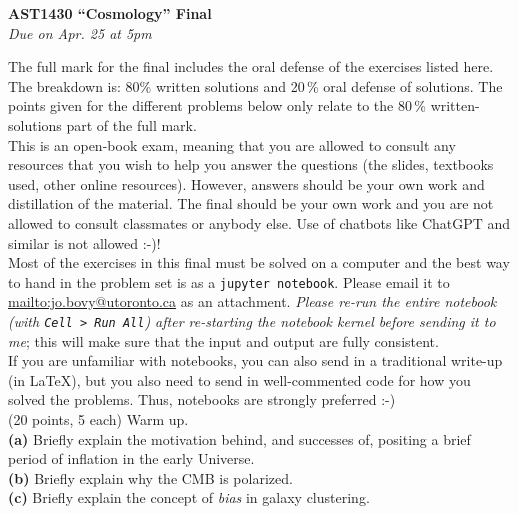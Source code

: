 \documentclass[12pt]{article}
\begin{document}
\begin{center}
{\bf \LARGE AST1430 ``Cosmology'' Final}\\[7pt]
\emph{Due on Apr. 25 at 5pm}\\[7pt]
\end{center}

The full mark for the final includes the oral defense of the exercises
listed here. The breakdown is: 80\% written solutions and 20\,\% oral
defense of solutions. The points given for the different problems
below only relate to the 80\,\% written-solutions part of the full
mark.\\

This is an open-book exam, meaning that you are allowed to consult any 
resources that you wish to help you answer the questions (the slides, 
textbooks used, other online resources). However, answers should be your 
own work and distillation of the material. The final should be your own work 
and you are not allowed to consult classmates or anybody else. 
Use of chatbots like ChatGPT and similar is not allowed :-)!\\

Most of the exercises in this final must be solved on a computer
and the best way to hand in the problem set is as a \texttt{jupyter
  notebook}. Please email it to \url{mailto:jo.bovy@utoronto.ca} as an attachment. 
  \emph{Please re-run the entire notebook (with \texttt{Cell
    > Run All}) after re-starting the notebook kernel before sending it
  to me}; this will make sure that the input and output are fully
consistent.\\

If you are unfamiliar with notebooks, you can also send in a
traditional write-up (in LaTeX), but you also need to send in
well-commented code for how you solved the problems. Thus, notebooks
are strongly preferred :-)\\

 (20 points, 5 each) Warm up.\\

{\bf (a)} Briefly explain the motivation behind, and successes of, positing 
a brief period of inflation in the early Universe.\\

{\bf (b)} Briefly explain why the CMB is polarized.\\

{\bf (c)} Briefly explain the concept of \emph{bias} in galaxy clustering.\\
\end{document}
